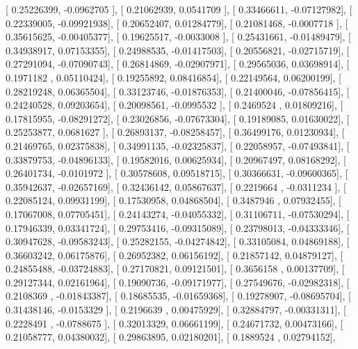 \documentclass{article}
\begin{document}
       [ 0.25226399, -0.0962705 ],
       [ 0.21062939,  0.0541709 ],
       [ 0.33466611, -0.07127982],
       [ 0.22339005, -0.09921938],
       [ 0.20652407,  0.01284779],
       [ 0.21081468, -0.0007718 ],
       [ 0.35615625, -0.00405377],
       [ 0.19625517, -0.0033008 ],
       [ 0.25431661, -0.01489479],
       [ 0.34938917,  0.07153355],
       [ 0.24988535, -0.01417503],
       [ 0.20556821, -0.02715719],
       [ 0.27291094, -0.07090743],
       [ 0.26814869, -0.02907971],
       [ 0.29565036,  0.03698914],
       [ 0.1971182 ,  0.05110424],
       [ 0.19255892,  0.08416854],
       [ 0.22149564,  0.06200199],
       [ 0.28219248,  0.06365504],
       [ 0.33123746, -0.01876353],
       [ 0.21400046, -0.07856415],
       [ 0.24240528,  0.09203654],
       [ 0.20098561, -0.0995532 ],
       [ 0.2469524 ,  0.01809216],
       [ 0.17815955, -0.08291272],
       [ 0.23026856, -0.07673304],
       [ 0.19189085,  0.01630022],
       [ 0.25253877,  0.0681627 ],
       [ 0.26893137, -0.08258457],
       [ 0.36499176,  0.01230934],
       [ 0.21469765,  0.02375838],
       [ 0.34991135, -0.02325837],
       [ 0.22058957, -0.07493841],
       [ 0.33879753, -0.04896133],
       [ 0.19582016,  0.00625934],
       [ 0.20967497,  0.08168292],
       [ 0.26401734, -0.0101972 ],
       [ 0.30578608,  0.09518715],
       [ 0.30366631, -0.09600365],
       [ 0.35942637, -0.02657169],
       [ 0.32436142,  0.05867637],
       [ 0.2219664 , -0.0311234 ],
       [ 0.22085124,  0.09931199],
       [ 0.17530958,  0.04868504],
       [ 0.3487946 ,  0.07932455],
       [ 0.17067008,  0.07705451],
       [ 0.24143274, -0.04055332],
       [ 0.31106711, -0.07530294],
       [ 0.17946339,  0.03341724],
       [ 0.29753416, -0.09315089],
       [ 0.23798013, -0.04333346],
       [ 0.30947628, -0.09583243],
       [ 0.25282155, -0.04274842],
       [ 0.33105084,  0.04869188],
       [ 0.36603242,  0.06175876],
       [ 0.26952382,  0.06156192],
       [ 0.21857142,  0.04879127],
       [ 0.24855488, -0.03724883],
       [ 0.27170821,  0.09121501],
       [ 0.3656158 ,  0.00137709],
       [ 0.29127344,  0.02161964],
       [ 0.19090736, -0.09171977],
       [ 0.27549676, -0.02982318],
       [ 0.2108369 , -0.01843387],
       [ 0.18685535, -0.01659368],
       [ 0.19278907, -0.08695704],
       [ 0.31438146, -0.0153329 ],
       [ 0.2196639 ,  0.00475929],
       [ 0.32884797, -0.00331311],
       [ 0.2228491 , -0.0788675 ],
       [ 0.32013329,  0.06661199],
       [ 0.24671732,  0.00473166],
       [ 0.21058777,  0.04380032],
       [ 0.29863895,  0.02180201],
       [ 0.1889524 ,  0.02794152],
\end{document}
